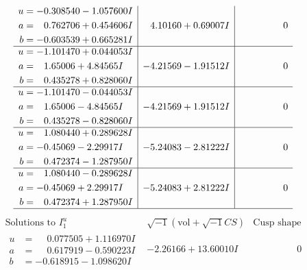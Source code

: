 \documentclass[1p]{elsarticle_modified}
\theoremstyle{definition}
\newcommand{\I}{\sqrt{-1}}
\begin{document}
$$\begin{array}{c|c|c}
\begin{aligned}
u &= -0.308540 - 1.057600 I \\
a &= \phantom{-}0.762706 + 0.454606 I \\
b &= -0.603539 + 0.665281 I\end{aligned}
 & \phantom{-}4.10160 + 0.69007 I & \phantom{-0.000000 } 0 \\ \hline\begin{aligned}
u &= -1.101470 + 0.044053 I \\
a &= \phantom{-}1.65006 + 4.84565 I \\
b &= \phantom{-}0.435278 + 0.828060 I\end{aligned}
 & -4.21569 - 1.91512 I & \phantom{-0.000000 } 0 \\ \hline\begin{aligned}
u &= -1.101470 - 0.044053 I \\
a &= \phantom{-}1.65006 - 4.84565 I \\
b &= \phantom{-}0.435278 - 0.828060 I\end{aligned}
 & -4.21569 + 1.91512 I & \phantom{-0.000000 } 0 \\ \hline\begin{aligned}
u &= \phantom{-}1.080440 + 0.289628 I \\
a &= -0.45069 - 2.29917 I \\
b &= \phantom{-}0.472374 - 1.287950 I\end{aligned}
 & -5.24083 - 2.81222 I & \phantom{-0.000000 } 0 \\ \hline\begin{aligned}
u &= \phantom{-}1.080440 - 0.289628 I \\
a &= -0.45069 + 2.29917 I \\
b &= \phantom{-}0.472374 + 1.287950 I\end{aligned}
 & -5.24083 + 2.81222 I & \phantom{-0.000000 } 0\\
 \hline 
 \end{array}$$\newpage$$\begin{array}{c|c|c}  
\text{Solutions to }I^u_{1}& \I (\text{vol} + \sqrt{-1}CS) & \text{Cusp shape}\\
 \hline 
\begin{aligned}
u &= \phantom{-}0.077505 + 1.116970 I \\
a &= \phantom{-}0.617919 - 0.590223 I \\
b &= -0.618915 - 1.098620 I\end{aligned}
 & -2.26166 + 13.60010 I & \phantom{-0.000000 } 0 \\ \hline\begin{aligned}

\end{aligned}
\end{array}$$
\end{document}
